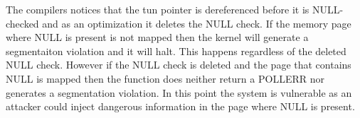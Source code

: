 The compilers notices that the tun pointer is dereferenced before it is
NULL-checked and as an optimization it deletes the NULL check. If the
memory page where NULL is present is not mapped then the kernel will
generate a segmentaiton violation and it will halt. This happens
regardless of the deleted NULL check. However if the NULL check is
deleted and the page that contains NULL is mapped then the function does
neither return a POLLERR nor generates a segmentation violation. In this
point the system is vulnerable as an attacker could inject dangerous
information in the page where NULL is present.
